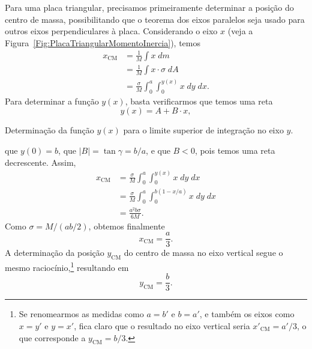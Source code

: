 Para uma placa triangular, precisamos primeiramente determinar a posição do centro de massa, possibilitando que o teorema dos eixos paralelos seja usado para outros eixos perpendiculares à placa. Considerando o eixo $x$ (veja a Figura~\ref{Fig:PlacaTriangularMomentoInercia}), temos
\begin{align}
    x_{\text{CM}} &= \frac{1}{M} \int x \; dm \\
    &=\frac{1}{M} \int x\cdot\sigma \; dA \\
    &= \frac{\sigma}{M} \int_0^a \int_0^{y(x)} x \; dy\;dx.
\end{align}
%
Para determinar a função $y(x)$, basta verificarmos que temos uma reta
\begin{equation}
    y(x) = A + B \cdot x,
\end{equation}

\begin{marginfigure}
\centering
{}
\caption{Determinação da função $y(x)$ para o limite superior de integração no eixo $y$. \label{Fig:PlacaTriangularMomentoInercia2}}
\end{marginfigure}

\noindent{}que $y(0) = b$, que $|B| = \tan \gamma = b/a$, e que $B < 0$, pois temos uma reta decrescente. Assim,
\begin{align}
    x_{\text{CM}} &= \frac{\sigma}{M} \int_0^a \int_0^{y(x)} x \; dy\;dx \\
    &= \frac{\sigma}{M} \int_0^a \int_0^{b(1-x/a)} x \; dy\;dx \\
    &= \frac{a^2b\sigma}{6M}.
\end{align}
%
Como $\sigma = M / (ab/2)$, obtemos finalmente
\begin{equation}
    x_{\text{CM}} = \frac{a}{3}.
\end{equation}
%
A determinação da posição $y_{\text{CM}}$ do centro de massa no eixo vertical segue o mesmo raciocínio,\footnote{Se renomearmos as medidas como $a = b'$ e $b = a'$, e também os eixos como $x = y'$ e $y = x'$, fica claro que o resultado no eixo vertical seria $x'_{\text{CM}} = a'/3$, o que corresponde a $y_{\text{CM}} = b/3$.} resultando em
\begin{equation}
    y_{\text{CM}} = \frac{b}{3}.
\end{equation}

